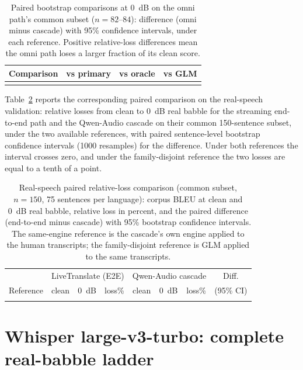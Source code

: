 \documentclass[11pt]{article}
\begin{document}
\begin{table}[h]
\centering
\caption{Paired bootstrap comparisons at 0~dB on the omni path's common
subset ($n = 82$--$84$): difference (omni minus cascade) with 95\%
confidence intervals, under each reference. Positive relative-loss
differences mean the omni path loses a larger fraction of its clean
score.}
\label{tab:paired}
\footnotesize
\setlength{\tabcolsep}{3pt}
\begin{tabular}{lccc}
\toprule
Comparison & vs primary & vs oracle & vs GLM \\
\midrule
 \\
\bottomrule
\end{tabular}
\end{table}

Table~\ref{tab:realpaired} reports the corresponding paired comparison on
the real-speech validation: relative losses from clean to 0~dB real babble
for the streaming end-to-end path and the Qwen-Audio cascade on their
common 150-sentence subset, under the two available references, with
paired sentence-level bootstrap confidence intervals (1000 resamples) for
the difference. Under both references the interval crosses zero, and
under the family-disjoint reference the two losses are equal to a tenth
of a point.

\begin{table}[t]
\centering
\caption{Real-speech paired relative-loss comparison (common subset,
$n = 150$, 75 sentences per language): corpus BLEU at clean and 0~dB real
babble, relative loss in percent, and the paired difference (end-to-end
minus cascade) with 95\% bootstrap confidence intervals. The same-engine
reference is the cascade's own engine applied to the human transcripts;
the family-disjoint reference is GLM applied to the same transcripts.}
\label{tab:realpaired}
\small
\setlength{\tabcolsep}{3pt}
\begin{tabular}{lccccccc}
\toprule
 & \multicolumn{3}{c}{LiveTranslate (E2E)} & \multicolumn{3}{c}{Qwen-Audio cascade} & Diff. \\
Reference & clean & 0~dB & loss\% & clean & 0~dB & loss\% & (95\% CI) \\
\midrule
 \\
\bottomrule
\end{tabular}
\end{table}

\section{Whisper large-v3-turbo: complete real-babble ladder}
\label{supp:whisperturbo}
\end{document}
